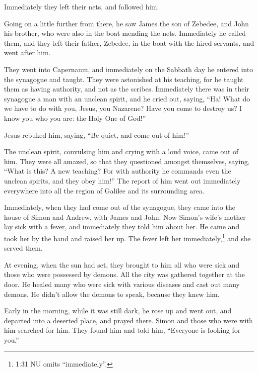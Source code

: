  Immediately they left their nets, and followed him.

 Going on a little further from there, he saw James the son
of Zebedee, and John his brother, who were also in the boat mending the
nets.  Immediately he called them, and they left their
father, Zebedee, in the boat with the hired servants, and went after
him.

 They went into Capernaum, and immediately on the Sabbath
day he entered into the synagogue and taught.  They were
astonished at his teaching, for he taught them as having authority, and
not as the scribes.  Immediately there was in their
synagogue a man with an unclean spirit, and he cried out, 
saying, ``Ha! What do we have to do with you, Jesus, you Nazarene? Have
you come to destroy us? I know you who you are: the Holy One of God!''

 Jesus rebuked him, saying, ``Be quiet, and come out of
him!''

 The unclean spirit, convulsing him and crying with a loud
voice, came out of him.  They were all amazed, so that they
questioned amongst themselves, saying, ``What is this? A new teaching?
For with authority he commands even the unclean spirits, and they obey
him!''  The report of him went out immediately everywhere
into all the region of Galilee and its surrounding area.

 Immediately, when they had come out of the synagogue, they
came into the house of Simon and Andrew, with James and John.
 Now Simon's wife's mother lay sick with a fever, and
immediately they told him about her.  He came and took her
by the hand and raised her up. The fever left her
immediately,\footnote{1:31 NU omits ``immediately''.} and she served
them.

 At evening, when the sun had set, they brought to him all
who were sick and those who were possessed by demons.  All
the city was gathered together at the door.  He healed many
who were sick with various diseases and cast out many demons. He didn't
allow the demons to speak, because they knew him.

 Early in the morning, while it was still dark, he rose up
and went out, and departed into a deserted place, and prayed there.
 Simon and those who were with him searched for him.
 They found him and told him, ``Everyone is looking for
you.''

